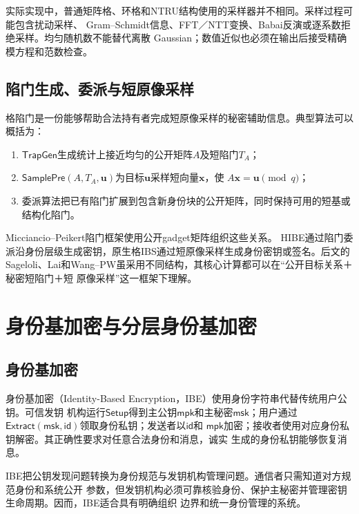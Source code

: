 实际实现中，普通矩阵格、环格和NTRU结构使用的采样器并不相同。采样过程可能包含扰动采样、
Gram--Schmidt信息、FFT／NTT变换、Babai反演或逐系数拒绝采样。均匀随机数不能替代离散
Gaussian；数值近似也必须在输出后接受精确模方程和范数检查。

\subsection{陷门生成、委派与短原像采样}

格陷门是一份能够帮助合法持有者完成短原像采样的秘密辅助信息。典型算法可以概括为：

\begin{enumerate}
  \item $\mathsf{TrapGen}$生成统计上接近均匀的公开矩阵$A$及短陷门$T_A$；
  \item $\mathsf{SamplePre}(A,T_A,\mathbf u)$为目标$\mathbf u$采样短向量$\mathbf x$，使
        $A\mathbf x=\mathbf u\pmod q$；
  \item 委派算法把已有陷门扩展到包含新身份块的公开矩阵，同时保持可用的短基或结构化陷门。
\end{enumerate}

Micciancio--Peikert陷门框架使用公开gadget矩阵组织这些关系\cite{micciancio2012trapdoors}。
HIBE通过陷门委派沿身份层级生成密钥，原生格IBS通过短原像采样生成身份密钥或签名。后文的
Sageloli、Lai和Wang--PW虽采用不同结构，其核心计算都可以在“公开目标关系＋秘密短陷门＋短
原像采样”这一框架下理解。

\section{身份基加密与分层身份基加密}

\subsection{身份基加密}

身份基加密（Identity-Based Encryption，IBE）使用身份字符串代替传统用户公钥。可信发钥
机构运行$\mathsf{Setup}$得到主公钥$\mathsf{mpk}$和主秘密$\mathsf{msk}$；用户通过
$\mathsf{Extract}(\mathsf{msk},\mathsf{id})$领取身份私钥；发送者以$\mathsf{id}$和
$\mathsf{mpk}$加密；接收者使用对应身份私钥解密。其正确性要求对任意合法身份和消息，诚实
生成的身份私钥能够恢复消息。

IBE把公钥发现问题转换为身份规范与发钥机构管理问题。通信者只需知道对方规范身份和系统公开
参数，但发钥机构必须可靠核验身份、保护主秘密并管理密钥生命周期。因而，IBE适合具有明确组织
边界和统一身份管理的系统。

